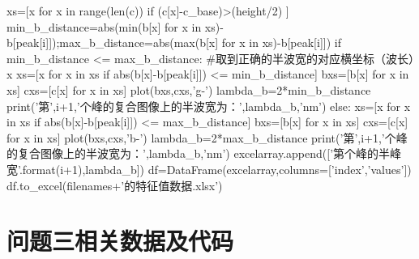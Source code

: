 \documentclass{article}
\numberwithin{equation}{subsection}
\begin{document}
\begin{python}
        xs=[x for x in range(len(c)) if (c[x]-c_base)>(height/2) ]
        min_b_distance=abs(min(b[x] for x in xs)-b[peak[i]]);max_b_distance=abs(max(b[x] for x in xs)-b[peak[i]])   
        if min_b_distance <= max_b_distance:                #取到正确的半波宽的对应横坐标（波长）x
            xs=[x for x in xs if abs(b[x]-b[peak[i]]) <= min_b_distance]
            bxs=[b[x] for x in xs]
            cxs=[c[x] for x in xs]
            plot(bxs,cxs,'g-')
            lambda_b=2*min_b_distance
            print('第',i+1,'个峰的复合图像上的半波宽为：',lambda_b,'nm')
        else:
            xs=[x for x in xs if abs(b[x]-b[peak[i]]) <= max_b_distance]
            bxs=[b[x] for x in xs]
            cxs=[c[x] for x in xs]
            plot(bxs,cxs,'b-')
            lambda_b=2*max_b_distance
            print('第',i+1,'个峰的复合图像上的半波宽为：',lambda_b,'nm')
        excelarray.append(['第{}个峰的半峰宽'.format(i+1),lambda_b])
    df=DataFrame(excelarray,columns=['index','values'])
    df.to_excel(filenames+'的特征值数据.xlsx')
    
\end{python}



\section{问题三相关数据及代码}
\end{document}
